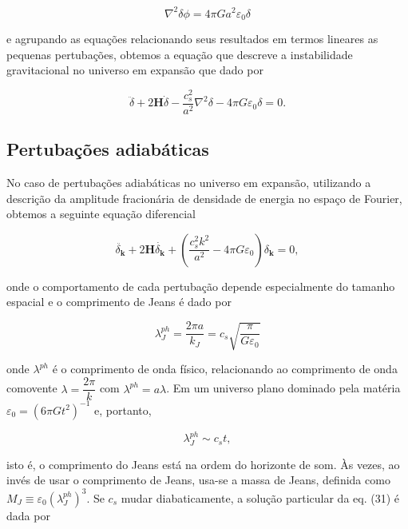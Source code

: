 \begin{equation}\label{eq29}
	\nabla^2\delta\phi = 4\pi Ga^2\varepsilon_0\delta
\end{equation}
 
e agrupando as equações relacionando seus resultados em termos lineares as pequenas pertubações, obtemos a equação que descreve a instabilidade gravitacional no universo em expansão que dado por
 
\begin{equation}\label{eq30}
 	\ddot{\delta} + 2\mathbf{H}\dot{\delta} - \dfrac{c^2_s}{a^2}\nabla^2\delta - 4\pi G\varepsilon_0\delta = 0.
\end{equation}

\subsection*{Pertubações adiabáticas}

No caso de pertubações adiabáticas no universo em expansão, utilizando a descrição da amplitude fracionária de densidade de energia no espaço de Fourier, obtemos a seguinte equação diferencial 

\begin{equation}\label{eq31}
	\ddot{\delta_\mathbf{k}} + 2\mathbf{H}\dot{\delta_\mathbf{k}} + \left( \dfrac{c^2_s k^2}{a^2} -4\pi G\varepsilon_0\right)\delta_\mathbf{k} = 0,
\end{equation} 

onde o comportamento de cada pertubação depende especialmente do tamanho espacial e o comprimento de Jeans é dado por

\begin{equation}\label{eq32}
	\lambda^{ph}_J = \dfrac{2\pi a }{k_J} = c_s\sqrt{\dfrac{\pi}{G\varepsilon_0}}
\end{equation}

onde $\lambda^{ph}$ é o comprimento de onda físico, relacionando
ao comprimento de onda comovente $\lambda = \dfrac{2\pi}{k}$ com $\lambda^{ph} = a\lambda$. Em um universo plano dominado pela matéria $\varepsilon_0 = (6\pi G t^2)^{-1}$ e, portanto,

\begin{equation}\label{eq33}
	\lambda_J^{ph} \sim c_s t,
\end{equation}

isto é, o comprimento do Jeans está na ordem do horizonte de som. Às vezes, ao  invés de usar o comprimento de Jeans, usa-se a massa de Jeans, definida como $M_J \equiv\varepsilon_0 (\lambda_J^{ph})^3$. Se $ c_s $ mudar diabaticamente, a solução particular da eq. (31) é dada por


